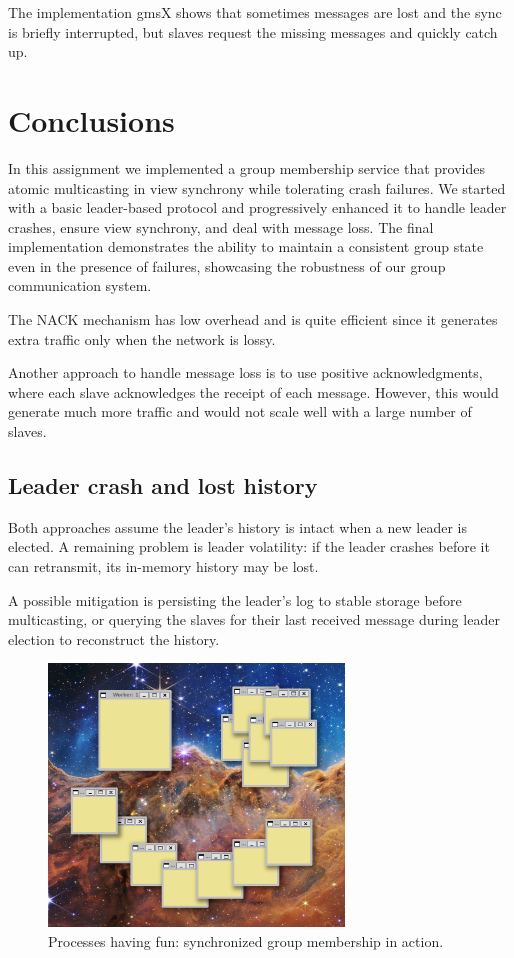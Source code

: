 \documentclass[a4paper, 11pt]{article}
\begin{document}
The implementation gmsX shows that sometimes messages are lost and the sync is briefly interrupted, but slaves request the missing messages and quickly catch up.

\section{Conclusions}

In this assignment we implemented a group membership service that provides atomic multicasting in view synchrony while tolerating crash failures. We started with a basic leader-based protocol and progressively enhanced it to handle leader crashes, ensure view synchrony, and deal with message loss. The final implementation demonstrates the ability to maintain a consistent group state even in the presence of failures, showcasing the robustness of our group communication system.

The NACK mechanism has low overhead and is quite efficient since it generates extra traffic only when the network is lossy.

Another approach to handle message loss is to use positive acknowledgments, where each slave acknowledges the receipt of each message. However, this would generate much more traffic and would not scale well with a large number of slaves.

\subsection{Leader crash and lost history}
Both approaches assume the leader's history is intact when a new leader is elected. A remaining problem is leader volatility: if the leader crashes before it can retransmit, its in-memory history may be lost.

A possible mitigation is persisting the leader's log to stable storage before multicasting, or querying the slaves for their last received message during leader election to reconstruct the history.

\begin{figure}[H]
  \centering
  \includegraphics[width=0.7\textwidth]{imgs/processes_having_fun.png}
  \caption{Processes having fun: synchronized group membership in action.}
  \label{fig:processes_having_fun}
\end{figure}
\end{document}
